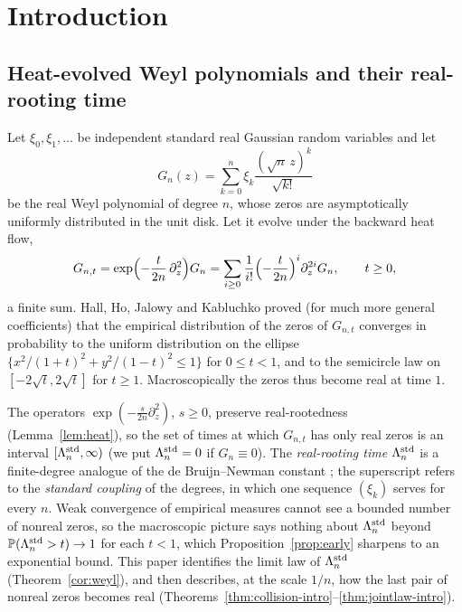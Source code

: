 \documentclass[11pt]{amsart}
\theoremstyle{definition}
\theoremstyle{remark}
\numberwithin{equation}{section}
\newcommand{\PP}{\mathbb{P}}
\begin{document}
\section{Introduction}\label{sec:intro}

\subsection{Heat-evolved Weyl polynomials and their real-rooting time}
Let $\xi_0,\xi_1,\dots$ be independent standard real Gaussian random variables and let
\begin{equation}\label{eq:weyl}
G_n(z)=\sum_{k=0}^{n}\xi_k\frac{(\sqrt n\,z)^k}{\sqrt{k!}}
\end{equation}
be the real Weyl polynomial of degree $n$, whose zeros are asymptotically uniformly distributed in the unit disk. Let it evolve under the backward heat flow,
\begin{equation}\label{eq:heat}
G_{n,t}=\exp\Bigl(-\frac{t}{2n}\,\partial_z^2\Bigr)G_n=\sum_{i\ge0}\frac1{i!}\Bigl(-\frac{t}{2n}\Bigr)^{i}\partial_z^{2i}G_n,\qquad t\ge0,
\end{equation}
a finite sum. Hall, Ho, Jalowy and Kabluchko \cite[Theorem~2.1]{HHJK} proved (for much more general coefficients) that the empirical distribution of the zeros of $G_{n,t}$ converges in probability to the uniform distribution on the ellipse $\{x^2/(1+t)^2+y^2/(1-t)^2\le1\}$ for $0\le t<1$, and to the semicircle law on $[-2\sqrt t,2\sqrt t]$ for $t\ge1$. Macroscopically the zeros thus become real at time $1$.

The operators $\exp(-\frac{s}{2n}\partial_z^2)$, $s\ge0$, preserve real-rootedness (Lemma~\ref{lem:heat}), so the set of times at which $G_{n,t}$ has only real zeros is an interval $[\Lambda_n^{\rm std},\infty)$ (we put $\Lambda_n^{\rm std}=0$ if $G_n\equiv0$). The \emph{real-rooting time} $\Lambda_n^{\rm std}$ is a finite-degree analogue of the de Bruijn--Newman constant \cite{dB,Ne,RT}; the superscript refers to the \emph{standard coupling} of the degrees, in which one sequence $(\xi_k)$ serves for every $n$. Weak convergence of empirical measures cannot see a bounded number of nonreal zeros, so the macroscopic picture says nothing about $\Lambda_n^{\rm std}$ beyond $\PP(\Lambda_n^{\rm std}>t)\to1$ for each $t<1$, which Proposition~\ref{prop:early} sharpens to an exponential bound. This paper identifies the limit law of $\Lambda_n^{\rm std}$ (Theorem~\ref{cor:weyl}), and then describes, at the scale $1/n$, how the last pair of nonreal zeros becomes real (Theorems~\ref{thm:collision-intro}--\ref{thm:jointlaw-intro}).
\end{document}
